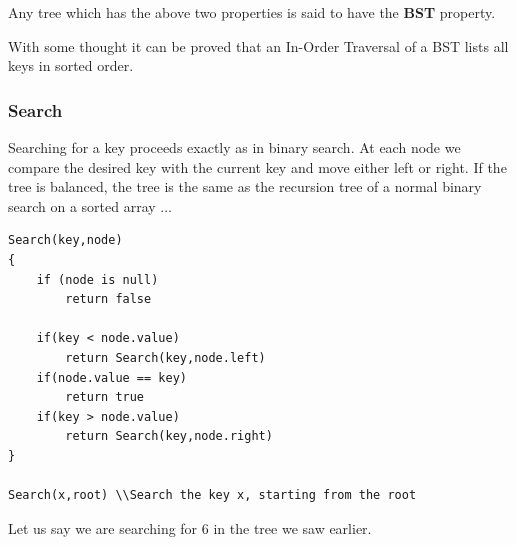 Any tree which has the above two properties is said to have the \textbf{BST} property.
\begin{center}
\end{center}

With some thought it can be proved that an In-Order Traversal of a BST lists all keys in sorted order.

\subsubsection*{Search}
Searching for a key proceeds exactly as in binary search. At each node we 
compare the desired key with the current key and move either left or right. 
If the tree is balanced, the tree is the same as the recursion tree of a normal binary search 
on a sorted array $\dots$ \\

\begin{center}
\begin{minipage}{0.9\linewidth}
\begin{framed}
\begin{Verbatim}
Search(key,node)
{
    if (node is null)
        return false

    if(key < node.value)
        return Search(key,node.left)
    if(node.value == key)
        return true
    if(key > node.value)
        return Search(key,node.right)
}

Search(x,root) \\Search the key x, starting from the root
\end{Verbatim}
\vspace{-4mm}
\end{framed}
\end{minipage}
\end{center}

Let us say we are searching for $6$ in the tree we saw earlier. 
\begin{center}
\end{center}


